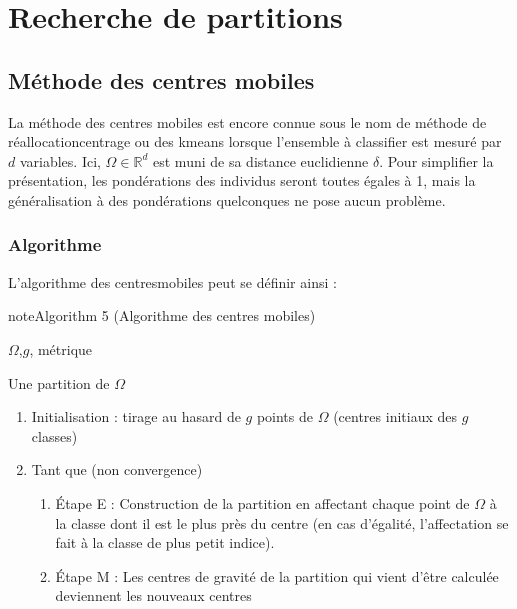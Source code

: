 \documentclass[letterpaper,10pt,english]{jupyterBook}
\begin{document}
\section{Recherche de partitions}
\label{\detokenize{clustering:recherche-de-partitions}}

\subsection{Méthode des centres mobiles}
\label{\detokenize{clustering:methode-des-centres-mobiles}}
\ignorespaces 
{}\ignorespaces 
\sphinxAtStartPar
La méthode des centres mobiles est encore connue sous le nom de méthode de réallocation\sphinxhyphen{}centrage ou des k\sphinxhyphen{}means lorsque l’ensemble à classifier est mesuré par \(d\) variables. Ici, \(\Omega \in \mathbb{R}^d\) est muni de sa distance euclidienne \(\delta\). Pour simplifier la présentation, les pondérations des individus seront toutes égales à 1, mais la généralisation à des pondérations quelconques ne pose aucun problème.


\subsubsection{Algorithme}
\label{\detokenize{clustering:id2}}
\sphinxAtStartPar
L’algorithme des centres\sphinxhyphen{}mobiles peut se définir ainsi :
\label{clustering:algorithm-4}
\begin{sphinxadmonition}{note}{Algorithm 5 (Algorithme des centres mobiles)}



\sphinxAtStartPar
{} \(\Omega\),\(g\), métrique

\sphinxAtStartPar
{} Une partition de \(\Omega\)
\begin{enumerate}
%
\item {} 
\sphinxAtStartPar
Initialisation : tirage au hasard de \(g\) points de  \(\Omega\) (centres initiaux des \(g\) classes)

\item {} 
\sphinxAtStartPar
Tant que (non convergence)
\begin{enumerate}
%
\item {} 
\sphinxAtStartPar
Étape E : Construction de la partition en affectant chaque point de \(\Omega\) à la classe dont il est le plus près du centre (en cas d’égalité, l’affectation se fait à la classe de plus petit indice).

\item {} 
\sphinxAtStartPar
Étape M : Les centres de gravité de la partition qui vient d’être calculée deviennent les nouveaux centres

\end{enumerate}

\end{enumerate}
\end{sphinxadmonition}
\end{document}
